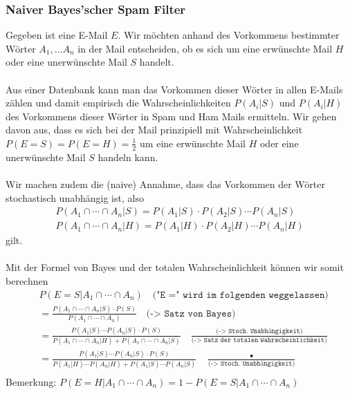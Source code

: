 \documentclass[a4paper]{article}
\begin{document}
\subsubsection{Naiver Bayes'scher Spam Filter}
Gegeben ist eine E-Mail $E$.  Wir möchten anhand des Vorkommens bestimmter Wörter $A_1, \ldots A_n$ in der Mail entscheiden, ob es sich um eine erwünschte Mail $H$ oder eine unerwünschte Mail $S$ handelt.\\\\
Aus einer Datenbank kann man das Vorkommen dieser Wörter in allen E-Mails zählen und damit empirisch die Wahrscheinlichkeiten $P(A_i | S)$ und $P(A_i | H) $ des Vorkommens dieser Wörter in Spam und Ham Mails ermitteln.  Wir gehen davon aus, dass es sich bei der Mail  prinzipiell mit  Wahrscheinlichkeit $P(E= S) = P(E= H)= \frac{1}{2}$  um eine erwünschte  Mail $H$ oder eine unerwünschte Mail $S$  handeln kann. \\\\
 Wir machen zudem die (naive) Annahme, dass das Vorkommen der Wörter  stochastisch unabhängig ist, also 
\begin{align*}
P(A_1 \cap \cdots \cap A_n | S) = P(A_1 | S) \cdot P(A_2 | S) \cdots P(A_n | S) \\
P(A_1 \cap \cdots \cap A_n | H) = P(A_1 | H) \cdot P(A_2 | H) \cdots P(A_n | H)
\end{align*}
gilt.\\\\
Mit der Formel von Bayes und der totalen Wahrscheinlichkeit  können wir somit berechnen
\begin{align*}
& P(E=S |  A_1 \cap \cdots \cap A_n) \quad \texttt{("E =" wird im folgenden weggelassen)}\\[5pt]
&= \frac{P(A_1 \cap \cdots \cap A_n | S) \cdot P(S)}{P(A_1 \cap \cdots \cap A_n)} \quad \texttt{(-> Satz von Bayes)}\\[5pt]
&=  \frac{P(A_1 | S) \cdots P(A_n | S) \cdot P(S)}{P(A_1 \cap \cdots \cap A_n | H) + P(A_1 \cap \cdots \cap A_n | S)} \quad \frac{\texttt{(-> Stoch. Unabhängigkeit)}}{\texttt{(-> Satz der totalen Wahrscheinlichkeit)}} \\[5pt]
&=  \frac{P(A_1 | S) \cdots P(A_n | S) \cdot P(S)}{P(A_1 | H) \cdots P(A_n | H)  + P(A_1 | S) \cdots P(A_n | S) } \quad \frac{•}{\texttt{(-> Stoch. Unabhängigkeit)}} \\
\end{align*}
Bemerkung: $P(E=H |  A_1 \cap \cdots \cap A_n) = 1- P(E=S |  A_1 \cap \cdots \cap A_n) $
\end{document}
